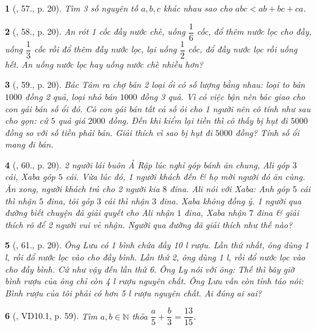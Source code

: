 \documentclass{article}
\newtheorem{baitoan}{}
\begin{document}
\begin{baitoan}[\cite{Binh_Toan_6_tap_2}, 57., p. 20]
	Tìm 3 số nguyên tố $a,b,c$ khác nhau sao cho $abc < ab + bc + ca$.
\end{baitoan}

\begin{baitoan}[\cite{Binh_Toan_6_tap_2}, 58., p. 20]
	An rót 1 cốc đầy nước chè, uống $\dfrac{1}{6}$ cốc, đổ thêm nước lọc cho đầy, uống $\dfrac{1}{3}$ cốc rồi đổ thêm đầy nước lọc, lại uống $\dfrac{1}{2}$ cốc, đổ đầy nước lọc rồi uống hết. An uống nước lọc hay uống nước chè nhiều hơn?
\end{baitoan}

\begin{baitoan}[\cite{Binh_Toan_6_tap_2}, 59., p. 20]
	Bác Tâm ra chợ bán 2 loại ổi có số lượng bằng nhau: loại to bán $1000$ đồng 2 quả, loại nhỏ bán $1000$ đồng 3 quả. Vì có việc bận nên bác giao cho con gái bán số ổi đó. Cô con gái bán tất cả số ỏi cho 1 người nên cô tính như sau cho gọn: cứ $5$ quả giá $2000$ đồng. Đến khi kiểm lại tiền thì cô thấy bị hụt đi $5000$ đồng so với số tiền phải bán. Giải thích vì sao bị hụt đi $5000$ đồng? Tính số ổi mang đi bán.
\end{baitoan}

\begin{baitoan}[\cite{Binh_Toan_6_tap_2}, 60., p. 20]
	2 người lái buôn Ả Rập lúc nghỉ góp bánh ăn chung, Ali góp $3$ cái, Xaba góp $5$ cái. Vừa lúc đó, 1 người khách đến \& họ mời người đó ăn cùng. Ăn xong, người khách trả cho 2 người kia $8$ đina. Ali nói với Xaba: Anh góp $5$ cái thì nhận $5$ đina, tôi góp $3$ cái thì nhận $3$ đina. Xaba không đồng ý. 1 người qua đường biết chuyện đã giải quyết cho Ali nhận $1$ đina, Xaba nhận $7$ đina \& giải thích rõ để 2 người vui vẻ nhận. Người qua đường đã giải thích như thế nào?
\end{baitoan}

\begin{baitoan}[\cite{Binh_Toan_6_tap_2}, 61., p. 20]
	Ông Lưu có 1 bình chứa đầy {\rm10 l} rượu. Lần thứ nhất, ông dùng {\rm1 l}, rồi đổ nước lọc vào cho đầy bình. Lần thứ 2, ông dùng {\rm1 l}, rồi đổ nước lọc vào cho đầy bình. Cứ như vậy đến lần thứ 6. Ông Ly nói với ông: Thế thì bây giờ bình rượu của ông chỉ còn {\rm4 l} rượu nguyên chất. Ông Lưu vẫn còn tỉnh táo nói: Bình rượu của tôi phải có hơn {\rm5 l} rượu nguyên chất. Ai đúng ai sai?
\end{baitoan}

\begin{baitoan}[\cite{TLCT_THCS_Toan_6_so_hoc}, VD10.1, p. 59]
	Tìm $a,b\in\mathbb{N}$ thỏa $\dfrac{a}{5} + \dfrac{b}{3} = \dfrac{13}{15}$.
\end{baitoan}
\end{document}
